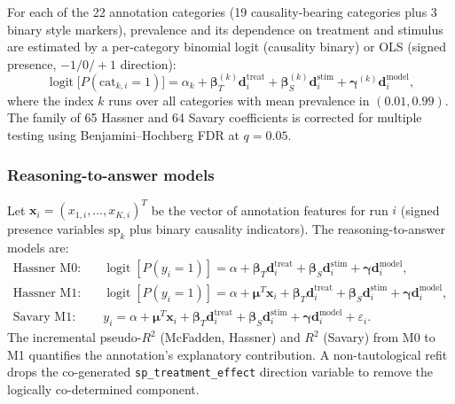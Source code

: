 \documentclass[14pt,a4paper]{extarticle}
\begin{document}
For each of the 22 annotation categories (19 causality-bearing categories plus 3 binary style markers), prevalence and its dependence on treatment and stimulus are estimated by a per-category binomial logit (causality binary) or OLS (signed presence, $-1/0/+1$ direction):
\begin{equation}
\operatorname{logit}\bigl[P(\text{cat}_{k,i} = 1)\bigr] = \alpha_k + \boldsymbol{\beta}_T^{(k)} \mathbf{d}^{\mathrm{treat}}_i + \boldsymbol{\beta}_S^{(k)} \mathbf{d}^{\mathrm{stim}}_i + \boldsymbol{\gamma}^{(k)} \mathbf{d}^{\mathrm{model}}_i,
\label{eq:cat-logit}
\end{equation}
where the index $k$ runs over all categories with mean prevalence in $(0.01, 0.99)$. The family of 65 Hassner and 64 Savary coefficients is corrected for multiple testing using Benjamini--Hochberg FDR at $q = 0.05$.

\subsubsection*{Reasoning-to-answer models}

Let $\mathbf{x}_i = (x_{1,i}, \ldots, x_{K,i})^T$ be the vector of annotation features for run $i$ (signed presence variables $\mathrm{sp}_k$ plus binary causality indicators). The reasoning-to-answer models are:
\begin{align}
\text{Hassner M0:}& \quad \operatorname{logit}[P(y_i=1)] = \alpha + \boldsymbol{\beta}_T \mathbf{d}^{\mathrm{treat}}_i + \boldsymbol{\beta}_S \mathbf{d}^{\mathrm{stim}}_i + \boldsymbol{\gamma} \mathbf{d}^{\mathrm{model}}_i, \label{eq:m0h} \\
\text{Hassner M1:}& \quad \operatorname{logit}[P(y_i=1)] = \alpha + \boldsymbol{\mu}^T \mathbf{x}_i + \boldsymbol{\beta}_T \mathbf{d}^{\mathrm{treat}}_i + \boldsymbol{\beta}_S \mathbf{d}^{\mathrm{stim}}_i + \boldsymbol{\gamma} \mathbf{d}^{\mathrm{model}}_i, \label{eq:m1h} \\
\text{Savary M1:}& \quad y_i = \alpha + \boldsymbol{\mu}^T \mathbf{x}_i + \boldsymbol{\beta}_T \mathbf{d}^{\mathrm{treat}}_i + \boldsymbol{\beta}_S \mathbf{d}^{\mathrm{stim}}_i + \boldsymbol{\gamma} \mathbf{d}^{\mathrm{model}}_i + \varepsilon_i. \label{eq:m1s}
\end{align}
The incremental pseudo-$R^2$ (McFadden, Hassner) and $R^2$ (Savary) from M0 to M1 quantifies the annotation's explanatory contribution. A non-tautological refit drops the co-generated \texttt{sp\_treatment\_effect} direction variable to remove the logically co-determined component.
\end{document}
